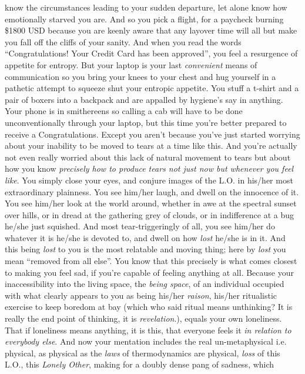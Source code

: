 \documentclass{article}
\begin{document}
know the circumstances leading to your sudden departure, let alone know
how emotionally starved you are. And so you pick a flight, for
a paycheck burning \$1800 USD because you are keenly aware that any
layover time will all but make you fall off the cliffs of your sanity.
And when you read the words ``Congratulations! Your Credit Card has been
approved'', you feel a resurgence of appetite for entropy. But your
laptop is your last \textit{convenient} means of communication so you
bring your knees to your chest and hug yourself in a pathetic attempt to
squeeze shut your entropic appetite. You stuff a t-shirt and a pair of
boxers into a backpack and are appalled by hygiene's say in anything.
Your phone is in smithereens so calling a cab will have to be done
unconventionally through your laptop, but this time you're better
prepared to receive a Congratulations. Except you aren't because you've
just started worrying about your inability to be moved to  tears at
a time like this. And you're actually not even really worried about this
lack of natural movement to tears but about how you know
\textit{precisely how to produce tears not just now but whenever you
feel like}. You simply close your eyes, and conjure images of the L.O.
in his/her most extraordinary plainness. You see him/her laugh, and
dwell on the innocence of it. You see him/her look at the world around,
whether in awe at the spectral sunset over hills, or in dread at the
gathering grey of clouds, or in indifference at a bug he/she just
squished. And most tear-triggeringly of all, you see him/her do whatever
it is he/she is devoted to, and dwell on how \textit{lost} he/she is in
it. And this being \textit{lost} to you is the most relatable and moving
thing; here by \textit{lost} you mean ``removed from all else''. You
know that this precisely is what comes closest to making you feel sad,
if you're capable of feeling anything at all. Because your
inaccessibility into the living space, the \textit{being space}, of an
individual occupied with what clearly appears to you as being his/her
\textit{raison}, his/her ritualistic exercise to keep boredom at bay
(which who said ritual means unthinking? It is really the end point of
thinking, it is \textit{revelation}.), equals your own loneliness. That
if loneliness means anything, it is this, that everyone feels it
\textit{in relation to everybody else}. And now your mentation includes
the real un-metaphysical i.e. physical, as physical as the \textit{laws}
of thermodynamics are physical, \textit{loss} of this L.O., this
\textit{Lonely Other}, making for a doubly dense pang of sadness, which
\end{document}
